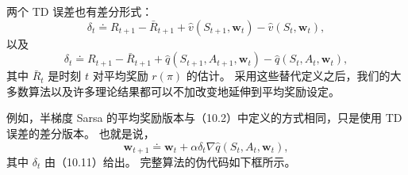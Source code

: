 \documentclass[UTF8, 12pt, fontset=fandol, oneside]{ctexart}
\begin{document}
两个 TD 误差也有差分形式：
\begin{equation}
\delta_t\doteq R_{t+1}-\bar R_{t+1}+\hat v(S_{t+1},\mathbf{w}_t)-\hat v(S_t,\mathbf{w}_t),
\tag{10.10}
\end{equation}
以及
\begin{equation}
\delta_t\doteq R_{t+1}-\bar R_{t+1}+\hat q(S_{t+1},A_{t+1},\mathbf{w}_t)-\hat q(S_t,A_t,\mathbf{w}_t),
\tag{10.11}
\end{equation}
其中 $\bar R_t$ 是时刻 $t$ 对平均奖励 $r(\pi)$ 的估计。
采用这些替代定义之后，我们的大多数算法以及许多理论结果都可以不加改变地延伸到平均奖励设定。

例如，半梯度 Sarsa 的平均奖励版本与（10.2）中定义的方式相同，只是使用 TD 误差的差分版本。
也就是说，
\begin{equation}
\mathbf{w}_{t+1}\doteq \mathbf{w}_t+\alpha\delta_t\nabla\hat q(S_t,A_t,\mathbf{w}_t),
\tag{10.12}
\end{equation}
其中 $\delta_t$ 由（10.11）给出。
完整算法的伪代码如下框所示。

\begin{center}
\end{center}
\end{document}
